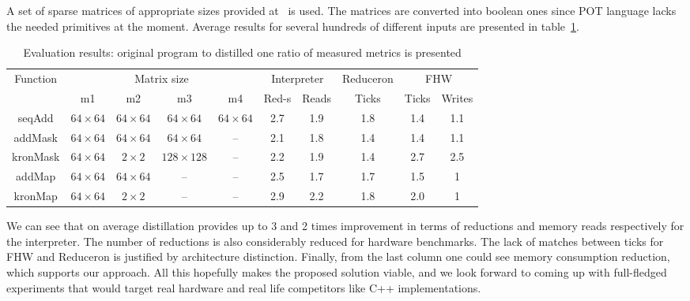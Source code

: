 A set of sparse matrices of appropriate sizes provided at~\cite{Matrices} is used. 
The matrices are converted into boolean ones since POT language lacks the needed primitives at the moment.
Average results for several hundreds of different inputs are presented in table~\ref{tbl:evaluationResults}.

\begin{table}[ht]
    \centering    
    \begin{tabular}{|c|c|c|c|c||c|c|c|c|c|}
        \hline
        \multirow{2}{*}{Function} &  \multicolumn{4}{c||}{Matrix size}  & \multicolumn{2}{c|}{Interpreter}            & Reduceron & \multicolumn{2}{c|}{FHW}\\
        \cline{2-10}
                                  &   m1 & m2 & m3 & m4                & Red-s & Reads                               & Ticks     & Ticks & Writes \\
        \hline
        \hline
        seqAdd   & $64 \times 64$ & $64 \times 64$ & $64 \times 64$ & $64 \times 64$ & 2.7          & 1.9        & 1.8 & 1.4 & 1.1 \\ 
        addMask  & $64 \times 64$ & $64 \times 64$ & $64 \times 64$ & --             & 2.1          & 1.8        & 1.4 & 1.4 & 1.1\\ 
        kronMask & $64 \times 64$ & $2 \times 2$   &$128 \times 128$& --             & 2.2          & 1.9        & 1.4 & 2.7 & 2.5\\ 
        addMap   & $64 \times 64$ & $64 \times 64$ & --             & --             & 2.5          & 1.7        & 1.7 & 1.5 & 1\\
        kronMap  & $64 \times 64$ & $2 \times 2$   & --             & --             & 2.9          & 2.2        & 1.8 & 2.0 & 1\\ 
        \hline
        
    \end{tabular}
    \caption{Evaluation results: original program to distilled one ratio of measured metrics is presented}
    \label{tbl:evaluationResults}
\end{table}

We can see that on average distillation provides up to 3 and 2 times improvement in terms of reductions and memory reads respectively for the interpreter. 
The number of reductions is also considerably reduced for hardware benchmarks. 
The lack of matches between ticks for FHW and Reduceron is justified by architecture distinction. 
Finally, from the last column one could see memory consumption reduction, which supports our approach.
All this hopefully makes the proposed solution viable, and we look forward to coming up with full-fledged experiments that would target real hardware and real life competitors like C++ implementations.
